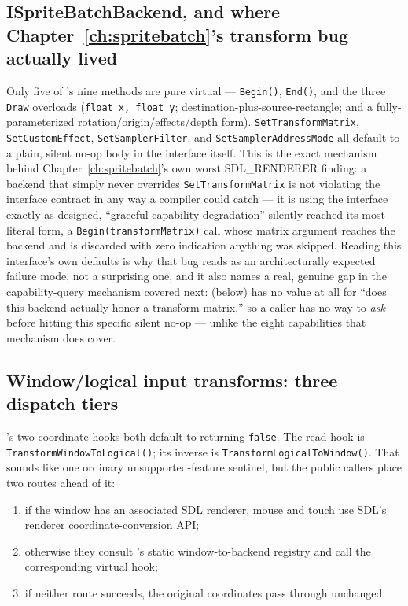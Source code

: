 \subsection{ISpriteBatchBackend, and where Chapter~\ref{ch:spritebatch}'s transform bug actually lived}

Only five of 's nine methods are pure virtual ---
\texttt{Begin()}, \texttt{End()}, and the three \texttt{Draw} overloads
(\texttt{float x, float y}; destination-plus-source-rectangle; and a fully-parameterized
rotation/origin/effects/depth form). \texttt{SetTransformMatrix}, \texttt{SetCustomEffect},
\texttt{SetSamplerFilter}, and \texttt{SetSamplerAddressMode} all default to a plain, silent
no-op body in the interface itself. This is the exact mechanism behind
Chapter~\ref{ch:spritebatch}'s own worst SDL\_RENDERER finding: a backend that simply never
overrides \texttt{SetTransformMatrix} is not violating the interface contract in any way a
compiler could catch --- it is using the interface exactly as designed, ``graceful capability
degradation'' silently reached its most literal form, a \texttt{Begin(transformMatrix)} call
whose matrix argument reaches the backend and is discarded with zero indication anything was
skipped. Reading this interface's own defaults is why that bug reads as an architecturally
expected failure mode, not a surprising one, and it also names a real, genuine gap in the
capability-query mechanism covered next:  (below) has no value at
all for ``does this backend actually honor a  transform matrix,'' so a
caller has no way to \emph{ask} before hitting this specific silent no-op --- unlike the eight
capabilities that mechanism does cover.

\subsection{Window/logical input transforms: three dispatch tiers}
\label{sec:backend-input-coordinate-matrix}

's two coordinate hooks both default to returning
\texttt{false}. The read hook is
\texttt{TransformWindow\allowbreak ToLogical()}; its inverse is
\texttt{TransformLogical\allowbreak ToWindow()}. That sounds like one ordinary
unsupported-feature sentinel, but the public callers place two routes ahead of it:

\begin{enumerate}
\item if the window has an associated SDL renderer, mouse and touch use SDL's renderer
  coordinate-conversion API;
\item otherwise they consult 's static window-to-backend registry
  and call the corresponding virtual hook;
\item if neither route succeeds, the original coordinates pass through unchanged.
\end{enumerate}

